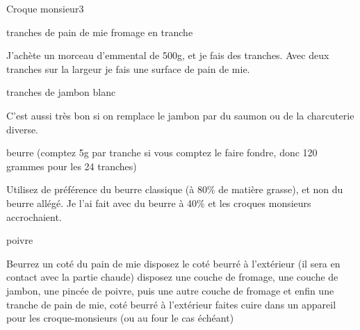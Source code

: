 \begin{recette}{Croque monsieur}{3}{}{}
\begin{ingredients}
 tranches de pain de mie
\ingredient fromage en tranche
\begin{remarque}
J'achète un morceau d'emmental de 500g, et je fais des tranches. Avec deux tranches sur la largeur je fais une surface de pain de mie.
\end{remarque}

 tranches de jambon blanc
\begin{remarque}
C'est aussi très bon si on remplace le jambon par du saumon ou de la charcuterie diverse.
\end{remarque}

\ingredient beurre (comptez 5g par tranche si vous comptez le faire fondre, donc 120 grammes pour les 24 tranches)
\begin{attention}
Utilisez de préférence du beurre classique (à 80\% de matière grasse), et non du beurre allégé. Je l'ai fait avec du beurre à 40\% et les croques monsieurs accrochaient.
\end{attention}

\ingredient poivre
\end{ingredients}

\begin{preparation}
\etape Beurrez un coté du pain de mie
\etape disposez le coté beurré à l'extérieur (il sera en contact avec la partie chaude)
\etape disposez une couche de fromage, une couche de jambon, une pincée de poivre, puis une autre couche de fromage et enfin une tranche de pain de mie, coté beurré à l'extérieur
\etape faites cuire dans un appareil pour les croque-monsieurs (ou au four le cas échéant)
\end{preparation}

\end{recette}

